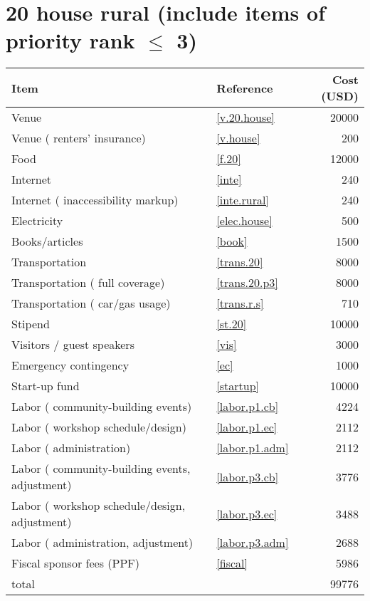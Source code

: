 \section*{20 house rural (include items of priority rank $\leq$ 3)}
\begin{center}
\begin{tabular}{llr}
Item & Reference & Cost (USD) \\ \hline
Venue & \ref{v.20.house} & 20000 \\
Venue ( renters' insurance) & \ref{v.house} & 200 \\
Food & \ref{f.20} & 12000 \\
Internet & \ref{inte} & 240 \\
Internet ( inaccessibility markup) & \ref{inte.rural} & 240 \\
Electricity & \ref{elec.house} & 500 \\
Books/articles & \ref{book} & 1500 \\
Transportation & \ref{trans.20} & 8000 \\
Transportation ( full coverage) & \ref{trans.20.p3} & 8000 \\
Transportation ( car/gas usage) & \ref{trans.r.s} & 710 \\
Stipend & \ref{st.20} & 10000 \\
Visitors / guest speakers & \ref{vis} & 3000 \\
Emergency contingency & \ref{ec} & 1000 \\
Start-up fund & \ref{startup} & 10000 \\
Labor ( community-building events) & \ref{labor.p1.cb} & 4224 \\
Labor ( workshop schedule/design) & \ref{labor.p1.ec} & 2112 \\
Labor ( administration) & \ref{labor.p1.adm} & 2112 \\
Labor ( community-building events, adjustment) & \ref{labor.p3.cb} & 3776 \\
Labor ( workshop schedule/design, adjustment) & \ref{labor.p3.ec} & 3488 \\
Labor ( administration, adjustment) & \ref{labor.p3.adm} & 2688 \\
Fiscal sponsor fees (PPF) & \ref{fiscal} & 5986 \\ \hline
total &  & 99776
\end{tabular}
\end{center}
\newpage
